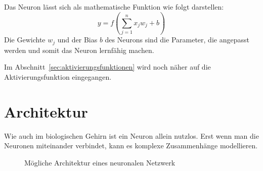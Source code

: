 \documentclass[12pt,a4paper]{report}
\begin{document}
Das Neuron lässt sich als mathematische Funktion wie folgt darstellen:
\[y =f\left(\sum_{j=1}^{n} x_j w_j + b\right)\]
Die Gewichte $w_j$ und der Bias $b$ des Neurons sind die Parameter, die angepasst werden und somit das Neuron lernfähig machen.

Im Abschnitt~\ref{sec:aktivierungsfunktionen} wird noch näher auf die Aktivierungsfunktion eingegangen.

\section{Architektur}
Wie auch im biologischen Gehirn ist ein Neuron allein nutzlos.
Erst wenn man die Neuronen miteinander verbindet, kann es komplexe Zusammenhänge modellieren.
\begin{figure}[!h]
    \centering
{}
    \caption{Mögliche Architektur eines neuronalen Netzwerk}
    \label{fig:network1}
\end{figure}
\end{document}
